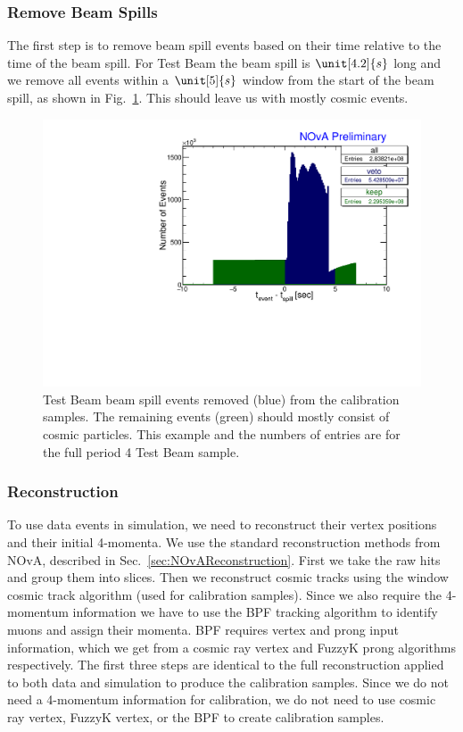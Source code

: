 \subsubsection*{Remove Beam Spills}
The first step is to remove beam spill events based on their time relative to the time of the beam spill. For Test Beam the beam spill is $\unit[4.2]{s}$ long and we remove all events within a $\unit[5]{s}$ window from the start of the beam spill, as shown in Fig.~\ref{fig:RemoveTBSpills}. This should leave us with mostly cosmic events.

\begin{figure}[hbtp]
\centering
\includegraphics[width=\textwidth]{Plots/TBCalibration/RemoveTBSpills.pdf}
\caption[Removing Test Beam beam spill]{Test Beam beam spill events removed (blue) from the calibration samples. The remaining events (green) should mostly consist of cosmic particles. This example and the numbers of entries are for the full period 4 Test Beam sample.}
\label{fig:RemoveTBSpills}
\end{figure}

\subsubsection*{Reconstruction}
To use data events in simulation, we need to reconstruct their vertex positions and their initial 4-momenta. We use the standard reconstruction methods from \gls{NOvA}, described in Sec.~\ref{sec:NOvAReconstruction}. First we take the raw hits and group them into slices. Then we reconstruct cosmic tracks using the window cosmic track algorithm (used for calibration samples). Since we also require the 4-momentum information we have to use the \gls{BPF} tracking algorithm to identify muons and assign their momenta. \gls{BPF} requires vertex and prong input information, which we get from a cosmic ray vertex and FuzzyK prong algorithms respectively. The first three steps are identical to the full reconstruction applied to both data and simulation to produce the calibration samples. Since we do not need a 4-momentum information for calibration, we do not need to use cosmic ray vertex, FuzzyK vertex, or the \gls{BPF} to create calibration samples.

